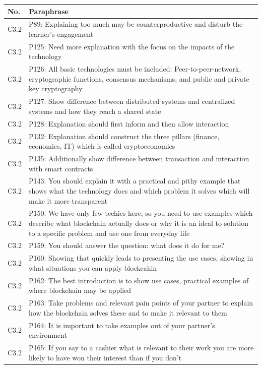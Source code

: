 \begin{table}[H]
    \centering
    \begin{tabularx}{\textwidth}{l|X}
    No. & Paraphrase \\\hline
   	C3.2 & P89: Explaining too much may be counterproductive and disturb the learner's engagement \\  
	C3.2 & P125: Need more explanation with the focus on the impacts of the technology \\ 
    C3.2 & P126: All basic technologies must be included: Peer-to-peer-network, cryptographic functions, consensus mechanisms, and public and private key cryptography \\  
	C3.2 & P127: Show difference between distributed systems and centralized systems and how they reach a shared state \\  
	C3.2 & P128: Explanation should first inform and then allow interaction \\  
	C3.2 & P132: Explanation should construct the three pillars (finance, economics, IT) which is called cryptoeconomics \\  
	C3.2 & P135: Additionally show difference between transaction and interaction with smart contracts \\  
	C3.2 & P143: You should explain it with a practical and pithy example that shows what the technology does and which problem it solves which will make it more transparent \\  
	C3.2 & P150: We have only few techies here, so you need to use examples which describe what blockchain actually does or why it is an ideal to solution to a specific problem and use one from everyday life \\  
	C3.2 & P159: You should answer the question: what does it do for me? \\  
	C3.2 & P160: Showing that quickly leads to presenting the use cases, showing in what situations you can apply blockcahin \\  
	C3.2 & P162: The best introduction is to show use cases, practical examples of where blockchain may be applied \\  
	C3.2 & P163: Take problems and relevant pain points of your partner to explain how the blockchain solves these and to make it relevant to them \\  
	C3.2 & P164: It is important to take examples out of your partner's environment \\  
	C3.2 & P165: If you say to a cashier what is relevant to their work you are more likely to have won their interest than if you don't \\\hline

\end{tabularx}
\end{table}
